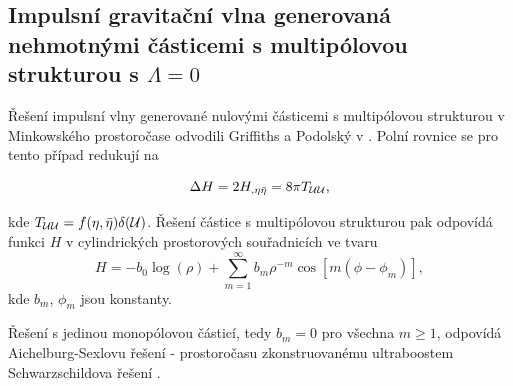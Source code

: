 \subsection{Impulsní gravitační vlna generovaná nehmotnými částicemi s multipólovou strukturou s $\Lambda=0$}

Řešení impulsní vlny generované nulovými částicemi s multipólovou strukturou v Minkowského prostoročase odvodili
Griffiths a Podolský v \cite{Griffiths_1997}. Polní rovnice se pro tento případ redukují na

\begin{equation}
    \label{eq:podminka_na_H}
    \Delta H = 2 H_{,\eta \bar{\eta}} = 8 \pi T_{\mathcal{U} \mathcal{U}},
\end{equation}
 
kde $T_{\mathcal{U} \mathcal{U}} = f(\eta, \bar{\eta}) \delta(\mathcal{U})$. Řešení částice s multipólovou strukturou pak odpovídá funkci $H$ v cylindrických prostorových souřadnicích ve tvaru
\begin{equation}
    \label{eq:multipole_minkowski}
    H = -b_0 \log(\rho) + \sum_{m=1}^\infty b_m \rho^{-m} \cos\left[ m \left(\phi - \phi_m \right) \right],
\end{equation}
kde $b_m$, $\phi_m$ jsou konstanty.

Řešení s jedinou monopólovou částicí, tedy $b_m=0$ pro všechna $m \geq 1$, odpovídá Aichelburg-Sexlovu řešení - prostoročasu
zkonstruovanému ultraboostem Schwarzschildova řešení \cite{Aichelburg_1971}.

